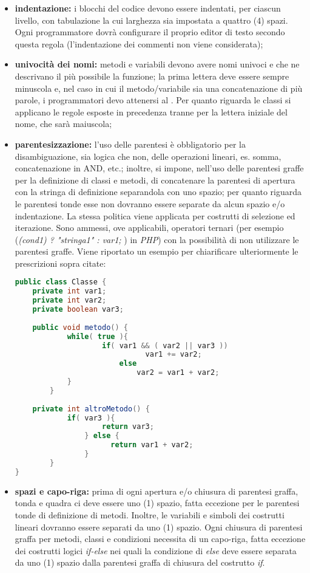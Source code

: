 					\begin{itemize}
						\item \textbf{indentazione:} i blocchi del codice devono essere indentati, per ciascun livello, con tabulazione la cui larghezza sia impostata a quattro (4) spazi. Ogni programmatore dovrà configurare il proprio editor di testo secondo questa regola (l'indentazione dei commenti non viene considerata);
						\item \textbf{univocità dei nomi:} metodi e variabili devono avere nomi univoci e che ne descrivano il più possibile la funzione; la prima lettera deve essere sempre minuscola e, nel caso in cui il metodo/variabile sia una concatenazione di più parole, i programmatori devo attenersi al .
						Per quanto riguarda le classi si applicano le regole esposte in precedenza tranne per la lettera iniziale del nome, che sarà maiuscola;
						\item \textbf{parentesizzazione:} l'uso delle parentesi è obbligatorio per la disambiguazione, sia logica che non, delle operazioni lineari, es. somma, concatenazione in AND, etc.; inoltre, si impone, nell'uso delle parentesi graffe per la definizione di classi e metodi, di concatenare la parentesi di apertura con la stringa di definizione separandola con uno spazio; per quanto riguarda le parentesi tonde esse non dovranno essere separate da alcun spazio e/o indentazione. La stessa politica viene applicata per costrutti di selezione ed iterazione. Sono ammessi, ove applicabili, operatori ternari (per esempio (\textit{(cond1) ? "stringa1" : var1; }) in \textit{PHP}) con la possibilità di non utilizzare le parentesi graffe. Viene riportato un esempio per chiarificare ulteriormente le prescrizioni sopra citate:
						
						\begin{lstlisting}[language=java,captionpos=b,caption={Esempio di dichiarazione di una classe in Java}]
public class Classe {
	private int var1;
	private int var2;
	private boolean var3;
	
	public void metodo() {
		    while( true ){
				    if( var1 && ( var2 || var3 ))
							  var1 += var2;
						else
						    var2 = var1 + var2;
			}
		}
	
	private int altroMetodo() {
		    if( var3 ){
				  	return var3;
				} else {
					  return var1 + var2;
				}
		}
}
						\end{lstlisting}

						\item \textbf{spazi e capo-riga:} prima di ogni apertura e/o chiusura di parentesi graffa, tonda e quadra ci deve essere uno (1) spazio, fatta eccezione per le parentesi tonde di definizione di metodi. Inoltre, le variabili e simboli dei costrutti lineari dovranno essere separati da uno (1) spazio. Ogni chiusura di parentesi graffa per metodi, classi e condizioni necessita di un capo-riga, fatta eccezione dei costrutti logici \textit{if-else} nei quali la condizione di \textit{else} deve essere separata da uno (1) spazio dalla parentesi graffa di chiusura del costrutto \textit{if}.
					\end{itemize}


